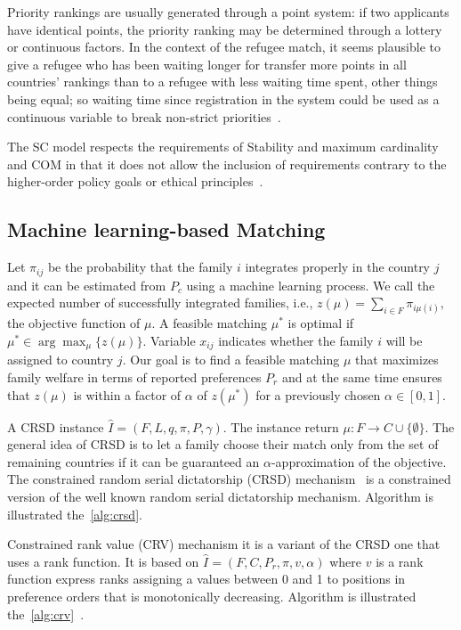 Priority rankings are usually generated through a point system: if two applicants have identical points, the priority ranking may be determined through a lottery or continuous factors.
In the context  of the refugee match, it seems plausible to give a refugee who has been waiting longer for transfer  more points in all countries’ rankings than to a refugee with less waiting time spent, other things being  equal;
so waiting time since registration in the system could be used as a continuous variable to break non-strict priorities~\cite{basshuysen}.

The SC model respects the requirements of Stability and maximum cardinality and COM in that it does not allow the inclusion of requirements contrary to the higher-order policy goals or ethical principles~\cite{basshuysen}.


\subsection{Machine learning-based Matching}\label{machine-learning-based-matching}%

Let \(\pi_{ij}\) be the probability that the family \(i\) integrates properly in the country \(j\) and it can be estimated from \(P_c\) using a machine learning process.
We call the expected number of successfully integrated families, i.e., \(z (\mu) = \sum_{i \in F} \pi_{i \mu (i)}\), the objective function of \(\mu\). A feasible matching \(\mu^*\) is optimal if \(\mu^* \in \arg\max_{\mu} \{z (\mu)\}\).
Variable \(x_{ij}\) indicates whether the family \(i\) will be assigned to country \(j\).
Our goal is to find a feasible matching \(\mu\) that maximizes family welfare in terms of reported preferences \(P_r\) and at the same time ensures that \(z (\mu)\) is within a factor of \(\alpha\) of \(z \left( \mu^* \right) \) for a previously chosen \(\alpha \in [0,1]\).

A CRSD instance \(\hat {I} = (F, L, q, \pi, P, \gamma)\). The instance return \(\mu : F \rightarrow C \cup \{\emptyset\}\).
The general idea of CRSD is to let a family choose their match only from the set of remaining countries if it can be guaranteed an \(\alpha\)-approximation of the objective.
The constrained random serial dictatorship (CRSD) mechanism~\citet{bansak_2018} is a constrained version of the well known random serial dictatorship mechanism.
Algorithm is illustrated the~\ref{alg:crsd}.

Constrained rank value (CRV) mechanism it is a variant of the CRSD one that uses a rank function.
It is based on \(\hat {I} = ( F , C , P_r , \pi  ,v, \alpha )\) where \(v\) is a rank function express ranks assigning a values between 0 and 1 to positions in preference orders that is monotonically decreasing.
Algorithm is illustrated the~\ref{alg:crv}~\citet{olbergml}.

